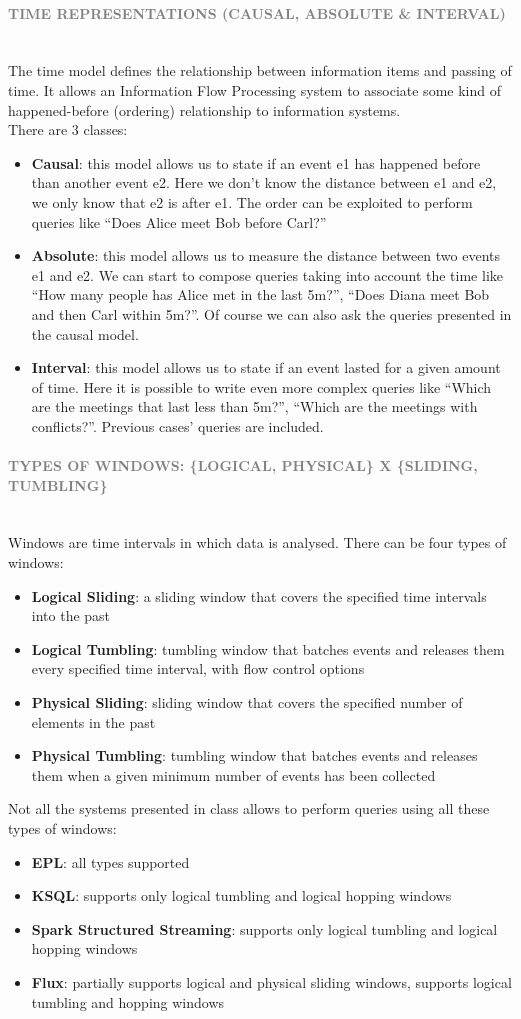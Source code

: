 \documentclass[10pt,a4paper]{article}
\newcommand{\myparagraph}[1]{\paragraph{\normalsize{\textcolor{gray}{\uppercase{\textbf{#1}}}} }\mbox{} \vspace{0.5em}\\}
\begin{document}
\myparagraph{Time representations (Causal, Absolute \& Interval)} 
The time model defines the relationship between information items and passing of time. It allows an Information Flow Processing system to associate some kind of happened-before (ordering) relationship to information systems. \\
There are 3 classes:
\begin{itemize}
	\item \textbf{Causal}: this model allows us to state if an event e1 has happened before than another event e2. Here we don’t know the distance between e1 and e2, we only know that e2 is after e1. The order can be exploited to perform queries like “Does Alice meet Bob before Carl?”
	\item \textbf{Absolute}: this model allows us to measure the distance between two events e1 and e2. We can start to compose queries taking into account the time like “How many people has Alice met in the last 5m?”, “Does Diana meet Bob and then Carl within 5m?”. Of course we can also ask the queries presented in the causal model.
	\item \textbf{Interval}: this model allows us to state if an event lasted for a given amount of time. Here it is possible to write even more complex queries like “Which are the meetings that last less than 5m?”, “Which are the meetings with conflicts?”. Previous cases’ queries are included.
\end{itemize}

\myparagraph{Types of windows: \{logical, physical\} x \{sliding, tumbling\}}
		
Windows are time intervals in which data is analysed. 
There can be four types of windows:
\begin{itemize}
	\item \textbf{Logical Sliding}: a sliding window that covers the specified time intervals into the past
	\item \textbf{Logical Tumbling}: tumbling window that batches events and releases them every specified time interval, with flow control options
	\item \textbf{Physical Sliding}: sliding window that covers the specified number of elements in the past
	\item \textbf{Physical Tumbling}: tumbling window that batches events and releases them when a given minimum number of events has been collected
\end{itemize}
Not all the systems presented in class allows to perform queries using all these types of windows:
\begin{itemize}
	\item \textbf{EPL}: all types supported
	\item \textbf{KSQL}: supports only logical tumbling and logical hopping windows
	\item \textbf{Spark Structured Streaming}: supports only logical tumbling and logical hopping windows
	\item \textbf{Flux}: partially supports logical and physical sliding windows, supports logical tumbling and hopping windows
\end{itemize}
\end{document}
